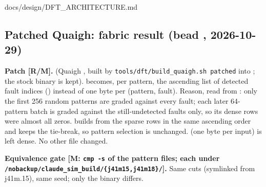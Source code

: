 \begin{relocated}{docs/design/DFT_ARCHITECTURE.md}
\subsection{\texorpdfstring{Patched Quaigh: fabric result (bead
,
2026-10-29)}{Patched Quaigh: fabric result (bead , 2026-10-29)}}\label{tm:ch:dft-architecture:189-patched-quaigh-fabric-result-bead-j41m18-2026-10-29}

\textbf{Patch {[}R/M{]}.}
 (Quaigh
, built by
\texttt{tools/\allowbreak{}dft/\allowbreak{}build\_\allowbreak{}quaigh.\allowbreak{}sh\ patched}
into ; the stock binary is
kept).  becomes, per pattern, the ascending
list of detected fault indices () instead of one byte per
(pattern, fault). Reason, read from : only the first 256
random patterns are graded against every fault; each later 64-pattern
batch is graded against the still-undetected faults only, so its dense
rows were almost all zeros.  builds
 from the sparse rows in the same ascending
order and keeps the  tie-break, so pattern selection is
unchanged.  (one byte per input) is left dense. No other
file changed.

\textbf{Equivalence gate {[}M: \texttt{cmp\ -\allowbreak{}s} of the
pattern files; each  under
\texttt{/\allowbreak{}nobackup/\allowbreak{}claude\_\allowbreak{}sim\_\allowbreak{}build/\allowbreak{}\{j41m15,\allowbreak{}j41m18\}/\allowbreak{}}{]}.}
Same cuts (symlinked from j41m.15), same seed; only the binary differs.


\end{relocated}
